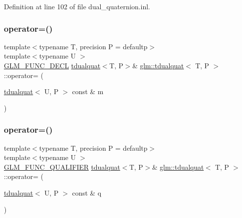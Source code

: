 Definition at line 102 of file dual\+\_\+quaternion.\+inl.

\mbox{\label{structglm_1_1tdualquat_a88370687edccdd5b6e62c9e314bc95c2}} 
\subsubsection{\texorpdfstring{operator=()}{operator=()}\hspace{0.1cm}{\footnotesize\ttfamily [2/3]}}
{\footnotesize\ttfamily template$<$typename T, precision P = defaultp$>$ \\
template$<$typename U $>$ \\
\mbox{\hyperlink{setup_8hpp_ab2d052de21a70539923e9bcbf6e83a51}{G\+L\+M\+\_\+\+F\+U\+N\+C\+\_\+\+D\+E\+CL}} \mbox{\hyperlink{structglm_1_1tdualquat}{tdualquat}}$<$T, P$>$\& \mbox{\hyperlink{structglm_1_1tdualquat}{glm\+::tdualquat}}$<$ T, P $>$\+::operator= (\begin{DoxyParamCaption}\item[{\mbox{\hyperlink{structglm_1_1tdualquat}{tdualquat}}$<$ U, P $>$ const \&}]{m }\end{DoxyParamCaption})}

\mbox{\label{structglm_1_1tdualquat_a4c6247ec39b3e82e5224988ec4312c77}} 
\subsubsection{\texorpdfstring{operator=()}{operator=()}\hspace{0.1cm}{\footnotesize\ttfamily [3/3]}}
{\footnotesize\ttfamily template$<$typename T, precision P = defaultp$>$ \\
template$<$typename U $>$ \\
\mbox{\hyperlink{setup_8hpp_a33fdea6f91c5f834105f7415e2a64407}{G\+L\+M\+\_\+\+F\+U\+N\+C\+\_\+\+Q\+U\+A\+L\+I\+F\+I\+ER}} \mbox{\hyperlink{structglm_1_1tdualquat}{tdualquat}}$<$T, P$>$\& \mbox{\hyperlink{structglm_1_1tdualquat}{glm\+::tdualquat}}$<$ T, P $>$\+::operator= (\begin{DoxyParamCaption}\item[{\mbox{\hyperlink{structglm_1_1tdualquat}{tdualquat}}$<$ U, P $>$ const \&}]{q }\end{DoxyParamCaption})}



